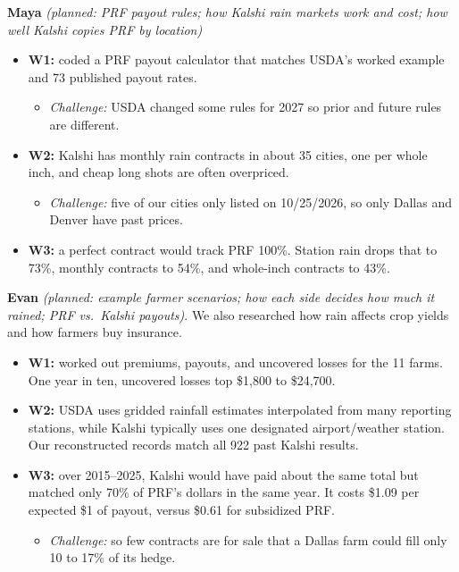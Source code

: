 \documentclass[10pt]{article}
\newcommand{\person}[2]{\par\vspace{2pt}\textbf{#1} \textit{(planned: #2)}}
\begin{document}
\person{Maya}{PRF payout rules; how Kalshi rain markets work and cost; how
well Kalshi copies PRF by location}
\begin{itemize}
  \item \textbf{W1:} coded a PRF payout calculator that matches USDA's worked
    example and 73 published payout rates.
    \begin{itemize}
      \item \emph{Challenge:} USDA changed some
        rules for 2027 so prior and future rules are different.
    \end{itemize}
  \item \textbf{W2:} Kalshi has monthly rain contracts in about 35 cities, one
    per whole inch, and cheap long shots are often overpriced.
    \begin{itemize}
      \item \emph{Challenge:} five of our cities only listed on 10/25/2026, so
        only Dallas and Denver have past prices.
    \end{itemize}
  \item \textbf{W3:} a perfect contract would track PRF 100\%. Station rain
    drops that to 73\%, monthly contracts to 54\%, and whole-inch
    contracts to 43\%.
\end{itemize}

\person{Evan}{example farmer scenarios; how each side decides how much it
rained; PRF vs.\ Kalshi payouts}. We also researched how rain affects crop
yields and how farmers buy insurance.
\begin{itemize}
  \item \textbf{W1:} worked out premiums, payouts, and uncovered losses for the
    11 farms. One year in ten, uncovered losses top \$1,800 to \$24,700.
  \item \textbf{W2:} USDA uses gridded rainfall estimates interpolated from many reporting stations, while Kalshi typically uses one designated airport/weather station. Our reconstructed records match all 922 past Kalshi results.
  \item \textbf{W3:} over 2015--2025, Kalshi would have paid about the same
    total but matched only 70\% of PRF's dollars in the same year. It costs
    \$1.09 per expected \$1 of payout, versus \$0.61 for subsidized PRF.
    \begin{itemize}
      \item \emph{Challenge:} so few contracts are for sale that a Dallas farm
        could fill only 10 to 17\% of its hedge.
    \end{itemize}
\end{itemize}
\end{document}
